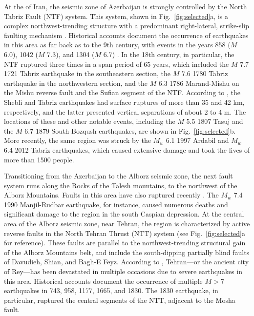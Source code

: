 At the  of Iran, the seismic zone of Azerbaijan is strongly controlled by the North Tabriz Fault (NTF) system. This system, shown in Fig.~\ref{fig:selected}a, is a complex northwest-trending structure with a predominant right-lateral, strike-slip faulting mechanism \citep{Berberian1999}. Historical accounts document the occurrence of earthquakes in this area as far back as to the 9th century, with events in the years 858 ($M$ 6.0), 1042 ($M$ 7.3), and 1304 ($M$ 6.7) \citep{Berberian1999}. In the 18th century, in particular, the NTF ruptured three times in a span period of 65 years, which included the $M$ 7.7 1721 Tabriz earthquake in the southeastern section, the $M$ 7.6 1780 Tabriz earthquake in the northwestern section, and the $M$ 6.3 1786 Marand-Mishu on the Mishu reverse fault and the Sufian segment of the NTF. According to \citet{Jones1834}, the Shebli and Tabriz earthquakes had surface ruptures of more than 35 and 42 km, respectively, and the latter presented vertical separations of about 2 to 4 m. The locations of these and other notable events, including the $M$ 5.5 1807 Tasuj and the $M$ 6.7 1879 South Bozqush earthquakes, are shown in Fig.~\ref{fig:selected}b. More recently, the same region was struck by the $M_w$ 6.1 1997 Ardabil and $M_w$ 6.4 2012 Tabriz earthquakes, which caused extensive damage and took the lives of more than 1500 people.

Transitioning from the Azerbaijan to the Alborz seismic zone, the next fault system runs along the Rocks of the Talesh mountains, to the northwest of the Alborz Mountains. Faults in this area have also ruptured recently \citep{Berberian1999}. The $M_w$ 7.4 1990 Manjil-Rudbar earthquake, for instance, caused numerous deaths and significant damage to the region in the south Caspian depression. At the central area of the Alborz seismic zone, near Tehran, the region is characterized by active reverse faults in the North Tehran Thrust (NTT) system (see Fig.~\ref{fig:selected}a for reference). These faults are parallel to the northwest-trending structural gain of the Alborz Mountains belt, and include the south-dipping partially blind faults of Davudieh, Shian, and Bagh-E Feyz. According to \citet{Ambraseys_1982_Book}, Tehran---or the ancient city of Rey---has been devastated in multiple occasions due to severe earthquakes in this area. Historical accounts document the occurrence of multiple $M>7$ earthquakes in 743, 958, 1177, 1665, and 1830. The 1830 earthquake, in particular, ruptured the central segments of the NTT, adjacent to the Mosha fault.

